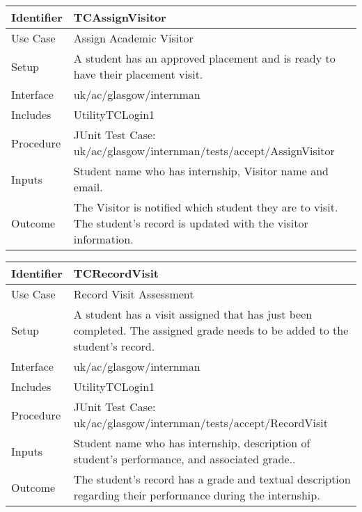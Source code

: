 \begin{tabularx}{\textwidth}{|T|L|}
\hline
Identifier & TCAssignVisitor\\
\hline
Use Case & Assign Academic Visitor\\
\hline
Setup & A student has an approved placement and is ready to have their
placement visit.\\
\hline
Interface & uk/ac/glasgow/internman\\
\hline
Includes & UtilityTCLogin1\\
\hline
Procedure & JUnit Test Case: uk/ac/glasgow/internman/tests/accept/AssignVisitor\\
\hline
Inputs & Student name who has internship, Visitor name and email.\\
\hline
Outcome & The Visitor is notified which student they are to visit. The student's
record is updated with the visitor information.\\
\hline
\end{tabularx}

\begin{tabularx}{\textwidth}{|T|L|}
\hline
Identifier & TCRecordVisit\\
\hline
Use Case & Record Visit Assessment\\
\hline
Setup & A student has a visit assigned that has just been completed. The 
assigned grade needs to be added to the student's record.\\
\hline
Interface & uk/ac/glasgow/internman\\
\hline
Includes & UtilityTCLogin1\\
\hline
Procedure & JUnit Test Case: uk/ac/glasgow/internman/tests/accept/RecordVisit\\
\hline
Inputs & Student name who has internship, description of student's
performance, and associated grade..\\
\hline
Outcome & The student's record has a grade and textual description regarding
their performance during the internship.\\
\hline
\end{tabularx}
